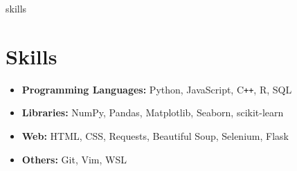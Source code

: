 \documentclass[letterpaper,11pt]{article}
\begin{document}
\begin{filecontents*}[overwrite]{skills}
    \section{Skills}
    \begin{itemize}
        \item \textbf{Programming Languages:} 
        Python, 
        JavaScript, 
        C\texttt{++},
        R, 
        SQL
        
        \item \textbf{Libraries:} 
        NumPy, Pandas, Matplotlib, 
        Seaborn, 
        scikit-learn
        
        \item \textbf{Web:} 
        HTML, CSS, 
        Requests, 
        Beautiful Soup, 
        Selenium, 
        Flask
    
    
        \item \textbf{Others:} 
        Git, 
        Vim, 
        WSL 
    \end{itemize}
\end{filecontents*}


\end{document}
